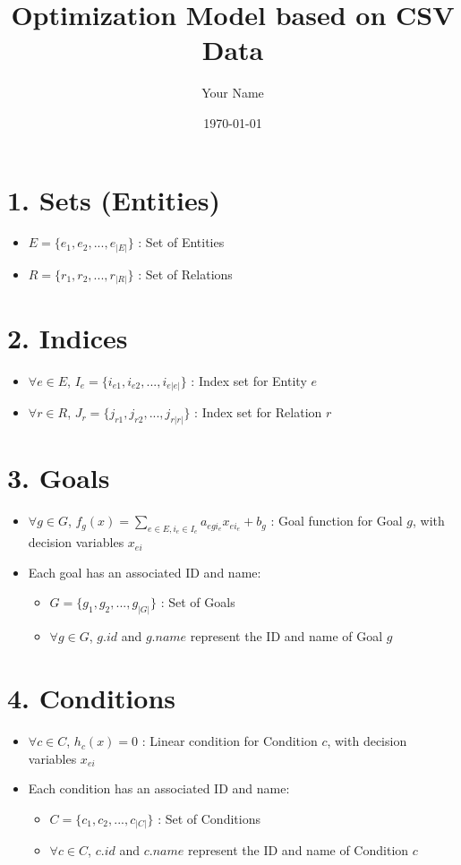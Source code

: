 \documentclass{article}
\title{Optimization Model based on CSV Data}
\author{Your Name}
\date{\today}
\begin{document}
\maketitle
\tableofcontents

\section{1. Sets (Entities)}
\begin{itemize}[leftmargin=*]
    \item $E = \{e_1, e_2, ..., e_{|E|}\}$ : Set of Entities
    \item $R = \{r_1, r_2, ..., r_{|R|}\}$ : Set of Relations
\end{itemize}

\section{2. Indices}
\begin{itemize}[leftmargin=*]
    \item $\forall e \in E$, $I_e = \{i_{e1}, i_{e2}, ..., i_{e|e|}\}$ : Index set for Entity $e$
    \item $\forall r \in R$, $J_r = \{j_{r1}, j_{r2}, ..., j_{r|r|}\}$ : Index set for Relation $r$
\end{itemize}

\section{3. Goals}
\begin{itemize}[leftmargin=*]
    \item $\forall g \in G$, $f_g(x) = \sum\limits_{e \in E, i_e \in I_e} a_{egi_e} x_{e i_e} + b_g$ : Goal function for Goal $g$, with decision variables $x_{ei}$
    \item Each goal has an associated ID and name:
    \begin{itemize}[leftmargin=*]
        \item $G = \{g_1, g_2, ..., g_{|G|}\}$ : Set of Goals
        \item $\forall g \in G$, $g.id$ and $g.name$ represent the ID and name of Goal $g$
    \end{itemize}
\end{itemize}

\section{4. Conditions}
\begin{itemize}[leftmargin=*]
    \item $\forall c \in C$, $h_c(x) = 0$ : Linear condition for Condition $c$, with decision variables $x_{ei}$
    \item Each condition has an associated ID and name:
    \begin{itemize}[leftmargin=*]
        \item $C = \{c_1, c_2, ..., c_{|C|}\}$ : Set of Conditions
        \item $\forall c \in C$, $c.id$ and $c.name$ represent the ID and name of Condition $c$
    \end{itemize}
\end{itemize}
\end{document}
